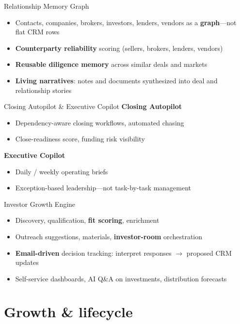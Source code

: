 \documentclass[aspectratio=169,11pt]{beamer}
\begin{document}
\begin{frame}{Relationship Memory Graph}
  \begin{itemize}
    \item Contacts, companies, brokers, investors, lenders, vendors as a \textbf{graph}---not flat CRM rows
    \item \textbf{Counterparty reliability} scoring (sellers, brokers, lenders, vendors)
    \item \textbf{Reusable diligence memory} across similar deals and markets
    \item \textbf{Living narratives}: notes and documents synthesized into deal and relationship stories
  \end{itemize}
\end{frame}

\begin{frame}{Closing Autopilot \& Executive Copilot}
  \textbf{Closing Autopilot}
  \begin{itemize}\itemsep2pt
    \item Dependency-aware closing workflows, automated chasing
    \item Close-readiness score, funding risk visibility
  \end{itemize}
  \textbf{Executive Copilot}
  \begin{itemize}\itemsep2pt
    \item Daily / weekly operating briefs
    \item Exception-based leadership---not task-by-task management
  \end{itemize}
\end{frame}

\begin{frame}{Investor Growth Engine}
  \begin{itemize}
    \item Discovery, qualification, \textbf{fit scoring}, enrichment
    \item Outreach suggestions, materials, \textbf{investor-room} orchestration
    \item \textbf{Email-driven} decision tracking: interpret responses $\rightarrow$ proposed CRM updates
    \item Self-service dashboards, AI Q\&A on investments, distribution forecasts
  \end{itemize}
\end{frame}

\section{Growth \& lifecycle}
\end{document}
